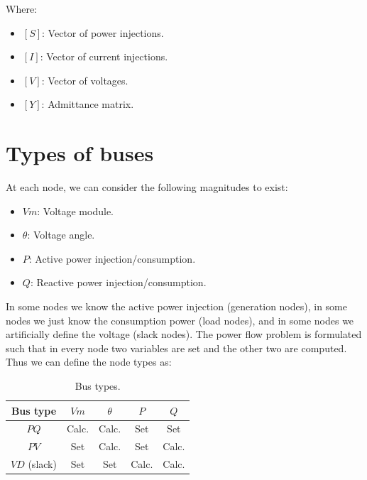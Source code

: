 \documentclass[nols,a4paper,twoside,notoc,fleqn]{tufte-book}
\begin{document}
Where:

\begin{itemize}
\item $[S]$: Vector of power injections.
\item $[I]$: Vector of current injections.
\item $[V]$: Vector of voltages.
\item $[Y]$: Admittance matrix.
\end{itemize}


\section{Types of buses}

At each node, we can consider the following magnitudes to exist:
\begin{itemize}
	\item $Vm$: Voltage module.
	\item $\theta$: Voltage angle.
	\item $P$: Active power injection/consumption.
	\item $Q$: Reactive power injection/consumption.
\end{itemize}

In some nodes we know the active power injection (generation nodes), in some nodes we just know the consumption power (load nodes), and in some nodes we artificially define the voltage (slack nodes). The power flow problem is formulated such that in every node two variables are set and the other two are computed. Thus we can define the node types as:

\begin{table}[h!]
	\begin{center}
		\begin{tabular}{ccccc}
			\toprule
			
			Bus type & $Vm$ &  $\theta$ & $P$ & $Q$\\
			
			\midrule
			
			$PQ$ & Calc. &  Calc. & Set & Set\\
			$PV$ & Set &  Calc. & Set & Calc.\\
			$VD$ (slack) & Set &  Set & Calc. & Calc.\\
			
			
			\bottomrule
		\end{tabular}
	\end{center}
	\caption{Bus types.}
	\label{bus__types}
\end{table}
\end{document}
